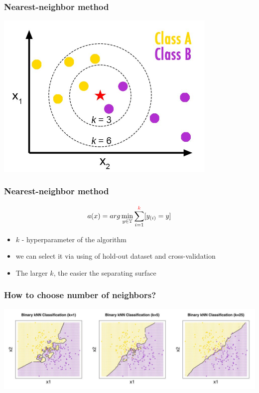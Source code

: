 \documentclass[default]{beamer}
\begin{document}
	\begin{frame}
		\frametitle{Nearest-neighbor method}
		
		\centering
		\includegraphics[width=0.8\textwidth]{linear_1.jpg}
	\end{frame}

	\begin{frame}
		\frametitle{Nearest-neighbor method}
		
		\[
			a(x)=arg\min_{y\in\mathbb Y}\sum_{i=1}^{\textcolor{red}{k}}[y_{(i)}=y]
		\]
		
		\begin{itemize}
			\item $k$ - hyperparameter of the algorithm
			\item we can select it via using of hold-out dataset and cross-validation
			\item The larger $k$, the easier the separating surface
		\end{itemize}
	\end{frame}

	\begin{frame}
		\frametitle{How to choose number of neighbors?}
		
		\centering
		\includegraphics[width=\textwidth]{linear_2.jpg}
	\end{frame}
\end{document}
